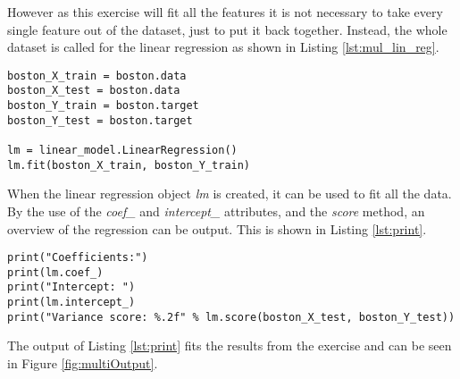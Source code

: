 However as this exercise will fit all the features it is not necessary to take every single feature out of the dataset, just to put it back together. Instead, the whole dataset is called for the linear regression as shown in Listing \ref{lst:mul_lin_reg}.

\begin{lstlisting}[caption={Linear Regression of multiple predictors}, label=lst:mul_lin_reg, mathescape=true]
boston_X_train = boston.data
boston_X_test = boston.data
boston_Y_train = boston.target
boston_Y_test = boston.target

lm = linear_model.LinearRegression()
lm.fit(boston_X_train, boston_Y_train)
\end{lstlisting}

When the linear regression object \emph{lm} is created, it can be used to fit all the data. By the use of the \emph{coef\_} and \emph{intercept\_} attributes, and the \emph{score} method, an overview of the regression can be output. This is shown in Listing \ref{lst:print}.

\begin{lstlisting}[caption={Printing regression overview}, label=lst:print, mathescape=true]
print("Coefficients:")
print(lm.coef_)
print("Intercept: ")
print(lm.intercept_)
print("Variance score: %.2f" % lm.score(boston_X_test, boston_Y_test))
\end{lstlisting}

The output of Listing \ref{lst:print} fits the results from the exercise and can be seen in Figure \ref{fig:multiOutput}.

